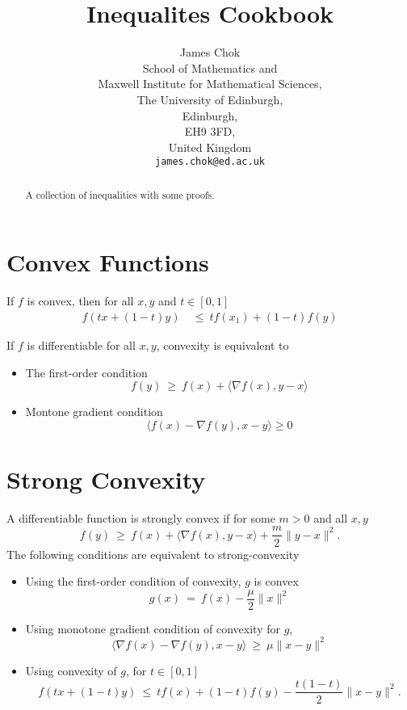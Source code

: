 \documentclass{article}
\title{Inequalites Cookbook}
\author{
  \hspace{1mm}James Chok \\
  School of Mathematics and \\
  Maxwell Institute for Mathematical Sciences, \\
  The University of Edinburgh,\\
  Edinburgh,\\
  EH9 3FD, \\
  United Kingdom\\
  \texttt{james.chok@ed.ac.uk} \\
}
\begin{document}
\maketitle

\begin{abstract}
A collection of inequalities with some proofs.
\end{abstract}

\tableofcontents

\newpage


\section{Convex Functions}
If $f$ is convex, then for all $x,y$ and $t\in[0,1]$
\begin{align}
    f(tx + (1-t)y)\ &\leq\ tf(x_1) + (1-t)f(y)
\end{align}

If $f$ is differentiable for all $x, y$, convexity is equivalent to 
\begin{itemize}
    \item The first-order condition
    \begin{equation}
    f(y)\ \geq\ f(x) +  \langle \nabla f(x), y - x\rangle
    \end{equation}
    \item Montone gradient condition
    \begin{equation}
        \langle f(x) - \nabla f(y), x - y\rangle \geq 0
    \end{equation}
\end{itemize}

\newpage
\section{Strong Convexity}
A differentiable function is strongly convex if for some $m>0$ and all $x,y$
\begin{equation}
    f(y)\ \geq\ f(x) + \langle\nabla f(x), y-x\rangle + \frac{m}{2}\|y-x\|^2.
\end{equation}
The following conditions are equivalent to strong-convexity
\begin{itemize}
    \item Using the first-order condition of convexity, $g$ is convex
    \begin{equation}
        g(x)\ =\ f(x) - \frac{\mu}{2}\|x\|^2
    \end{equation}
    \item Using monotone gradient condition of convexity for $g$,
    \begin{equation}
        \langle \nabla f(x) - \nabla f(y), x - y\rangle\ \geq\ \mu\|x-y\|^2
    \end{equation}
    \item Using convexity of $g$, for $t\in[0,1]$
    \begin{equation}
        f(tx + (1-t)y)\ \leq\ tf(x) + (1-t)f(y) - \frac{t(1-t)}{2}\|x-y\|^2.
    \end{equation}
\end{itemize}
\end{document}
